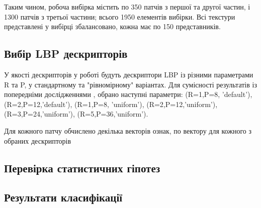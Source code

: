 Таким чином, робоча вибірка містить по 350 патчів з першої та другої частин, і 1300 патчів з третьої частини; всього 1950 елементів вибірки.
Всі текстури представлені у вибірці збалансовано, кожна має по 150 представників.

\subsection{Вибір LBP дескрипторів}\label{section2.1b}

У якості дескрипторів у роботі будуть дескриптори LBP із різними параметрами R та P, у стандартному та "рівномірному" варіантах.
Для сумісності результатів із попередніми дослідженнями \cite{ojala2002,fastlbp2024}, обрано наступні параметри:
(R=1,P=8, 'default'), (R=2,P=12,'default'), (R=1,P=8, 'uniform'), (R=2,P=12,'uniform'), (R=3,P=24,'uniform'), (R=5,P=36,'uniform').

Для кожного патчу обчислено декілька векторів ознак, по вектору для кожного з обраних дескрипторів 



\subsection{Перевірка статистичних гіпотез}\label{section2.1c}

\subsection{Результати класифікації}\label{section2.1d}

